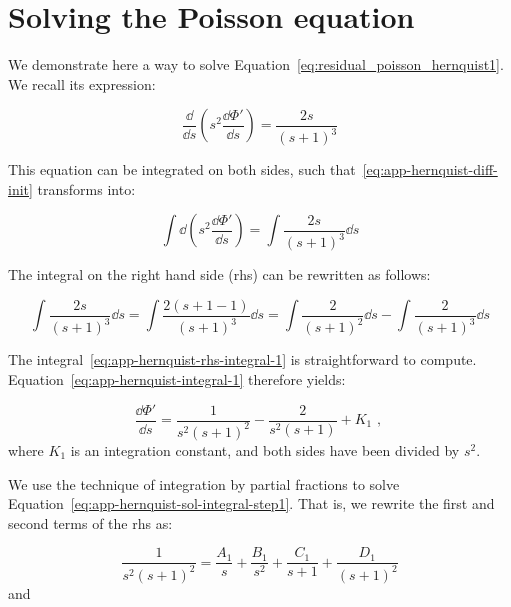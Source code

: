 \chapter{Solving the Poisson equation}\label{app:poisson}

We demonstrate here a way to solve Equation~\eqref{eq:residual_poisson_hernquist1}. We recall its expression:

\begin{equation}
    \label{eq:app-hernquist-diff-init}
    \dfrac{\dd}{\dd s}\left(s^2 \dfrac{\dd \Phi'}{\dd s}\right) = \dfrac{2s}{(s+1)^3}
\end{equation}

This equation can be integrated on both sides, such that~\eqref{eq:app-hernquist-diff-init} transforms into:

\begin{equation}
    \label{eq:app-hernquist-integral-1}
    \int \dd \left(s^2 \dfrac{\dd \Phi'}{\dd s}\right) = \int \dfrac{2s}{(s+1)^3} \dd s
\end{equation}

The integral on the right hand side (rhs) can be rewritten as follows:

\begin{equation}
    \label{eq:app-hernquist-rhs-integral-1}
    \int \dfrac{2s}{(s+1)^3} \dd s = \int \dfrac{2 (s + 1 -1)}{(s+1)^3} \dd s = \int \dfrac{2}{(s+1)^2} \dd s  - \int \dfrac{2}{(s+1)^3} \dd s 
\end{equation}

The integral~\eqref{eq:app-hernquist-rhs-integral-1} is straightforward to compute. Equation~\eqref{eq:app-hernquist-integral-1} therefore yields:

\begin{equation}
    \label{eq:app-hernquist-sol-integral-step1}
     \dfrac{\dd \Phi'}{\dd s} = \dfrac{1}{s^2(s+1)^2} -  \dfrac{2}{s^2(s+1)} + K_1\text{ , }
\end{equation} where $K_1$ is an integration constant, and both sides have been divided by $s^2$.

We use the technique of integration by partial fractions to solve Equation~\eqref{eq:app-hernquist-sol-integral-step1}. That is, we rewrite the first and second terms of the rhs as:

\begin{equation}
    \label{eq:app-ipf-term-1}
    \dfrac{1}{s^2(s+1)^2} = \frac{A_1}{s} + \frac{B_1}{s^2} + \frac{C_1}{s+1} + \frac{D_1}{(s+1)^2}
\end{equation} and 

